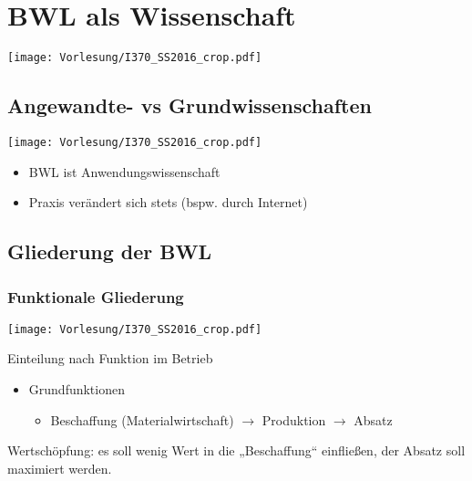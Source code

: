 




\newcommand{\folie}[1]{\begin{center}
\texttt{[image: Vorlesung/I370\_SS2016\_crop.pdf]}
\end{center}}



\maketitle
\newpage
\tableofcontents
\newpage


\chapter{BWL als Wissenschaft}
\folie{9}
\section{Angewandte- vs Grundwissenschaften}
\folie{10}
\begin{itemize}
\item BWL ist Anwendungswissenschaft
\item Praxis verändert sich stets (bspw. durch Internet)
\end{itemize}
\section{Gliederung der BWL}
\subsection{Funktionale Gliederung}
\folie{11}
Einteilung nach Funktion im Betrieb
\begin{itemize}
\item Grundfunktionen
\begin{itemize}
\item Beschaffung (Materialwirtschaft) $\rightarrow$ Produktion $\rightarrow$ Absatz
\end{itemize}
\end{itemize}
Wertschöpfung: es soll wenig Wert in die „Beschaffung“ einfließen, der Absatz soll maximiert werden.
